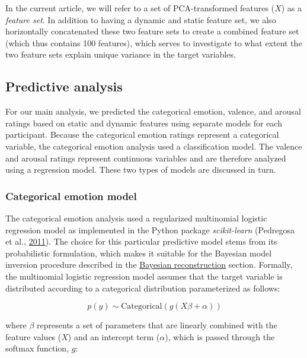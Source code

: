\documentclass[12pt,american,a4paper,oneside,]{memoir} %
\begin{document}
In the current article, we will refer to a set of PCA-transformed features (\(X\)) as a \emph{feature set}. In addition to having a dynamic and static feature set, we also horizontally concatenated these two feature sets to create a combined feature set (which thus contains 100 features), which serves to investigate to what extent the two feature sets explain unique variance in the target variables.

\hypertarget{svsd-pred-analysis}{%
\subsection{Predictive analysis}\label{svsd-pred-analysis}}

For our main analysis, we predicted the categorical emotion, valence, and arousal ratings based on static and dynamic features using separate models for each participant. Because the categorical emotion ratings represent a categorical variable, the categorical emotion analysis used a classification model. The valence and arousal ratings represent continuous variables and are therefore analyzed using a regression model. These two types of models are discussed in turn.

\hypertarget{svsd-cat-emo}{%
\subsubsection{Categorical emotion model}\label{svsd-cat-emo}}

The categorical emotion analysis used a regularized multinomial logistic regression model as implemented in the Python package \emph{scikit-learn} (Pedregosa et al., \protect\hyperlink{ref-pedregosa2011scikit}{2011}). The choice for this particular predictive model stems from its probabilistic formulation, which makes it suitable for the Bayesian model inversion procedure described in the \protect\hyperlink{svsd-bayes}{Bayesian reconstruction} section. Formally, the multinomial logistic regression model assumes that the target variable is distributed according to a categorical distribution parameterized as follows:

\begin{equation}
p(y) \sim \mathrm{Categorical}(g(X\beta + \alpha))
\end{equation}

where \(\beta\) represents a set of parameters that are linearly combined with the feature values (\(X\)) and an intercept term (\(\alpha\)), which is passed through the softmax function, \(g\):
\end{document}
